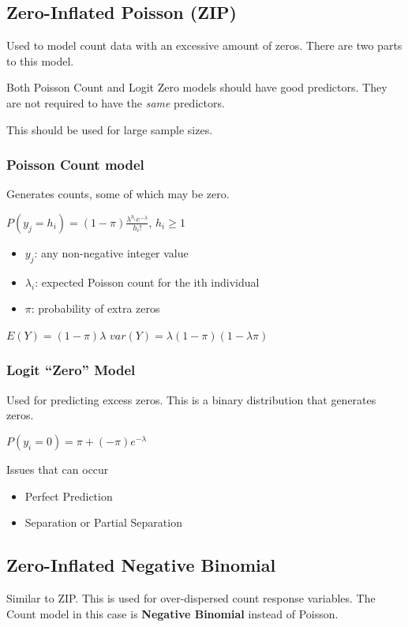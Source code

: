 \documentclass[11pt]{article}
\begin{document}
\subsection{Zero-Inflated Poisson (ZIP)}
\label{sec:org32cec25}
Used to model count data with an excessive amount of zeros. There are two parts
to this model.

Both Poisson Count and Logit Zero models should have good predictors. They are
not required to have the \emph{same} predictors.

This should be used for large sample sizes.

\subsubsection{Poisson Count model}
\label{sec:org9a3ed04}
Generates counts, some of which may be zero.

\(P(y_j = h_i) = (1 - \pi) \frac{\lambda^{h_i} e^{- \lambda}}{h_i !}\), \(h_i \geq 1\)

\begin{itemize}
\item \(y_j\): any non-negative integer value
\item \(\lambda_i\): expected Poisson count for the ith individual
\item \(\pi\): probability of extra zeros
\end{itemize}

\(E(Y) = (1 - \pi) \lambda\)
\(var(Y) = \lambda (1 - \pi) (1 - \lambda \pi)\)

\subsubsection{Logit ``Zero'' Model}
\label{sec:org7d17b4b}
Used for predicting excess zeros. This is a binary distribution that generates zeros.

\(P(y_i = 0) = \pi + (- \pi) e^{- \lambda}\)

Issues that can occur
\begin{itemize}
\item Perfect Prediction
\item Separation or Partial Separation
\end{itemize}

\subsection{Zero-Inflated Negative Binomial}
\label{sec:org79855b5}
Similar to ZIP. This is used for over-dispersed count response variables. The
Count model in this case is \textbf{Negative Binomial} instead of Poisson.
\end{document}
